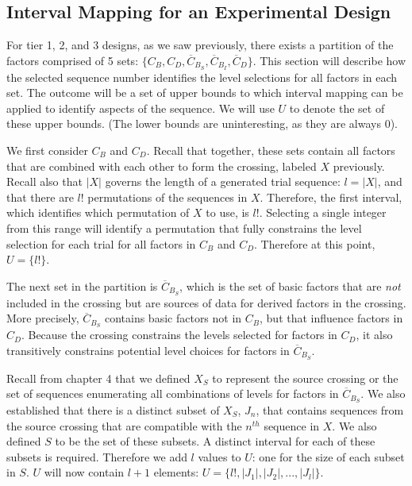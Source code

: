 \subsection{Interval Mapping for an Experimental Design}

For tier 1, 2, and 3 designs, as we saw previously, there exists a partition of the factors comprised of 5 sets: $\{C_B, C_D, \overline{C}_{B_S}, \overline{C}_{B_I}, \overline{C}_D\}$. This section will describe how the selected sequence number identifies the level selections for all factors in each set. The outcome will be a set of upper bounds to which interval mapping can be applied to identify aspects of the sequence. We will use $U$ to denote the set of these upper bounds. (The lower bounds are uninteresting, as they are always $0$).

We first consider $C_B$ and $C_D$. Recall that together, these sets contain all factors that are combined with each other to form the crossing, labeled $X$ previously. Recall also that $|X|$ governs the length of a generated trial sequence: $l = |X|$, and that there are $l!$ permutations of the sequences in $X$. Therefore, the first interval, which identifies which permutation of $X$ to use, is $l!$. Selecting a single integer from this range will identify a permutation that fully constrains the level selection for each trial for all factors in $C_B$ and $C_D$. Therefore at this point, $U = \{l!\}$.

The next set in the partition is $\overline{C}_{B_S}$, which is the set of basic factors that are \textit{not} included in the crossing but are sources of data for derived factors in the crossing. More precisely, $\overline{C}_{B_S}$ contains basic factors not in $C_B$, but that influence factors in $C_D$. Because the crossing constrains the levels selected for factors in $C_D$, it also transitively constrains potential level choices for factors in $\overline{C}_{B_S}$.

Recall from chapter 4 that we defined $X_S$ to represent the source crossing or the set of sequences enumerating all combinations of levels for factors in $\overline{C}_{B_S}$. We also established that there is a distinct subset of $X_S$, $J_n$, that contains sequences from the source crossing that are compatible with the $n^{th}$ sequence in $X$. We also defined $S$ to be the set of these subsets. A distinct interval for each of these subsets is required. Therefore we add $l$ values to $U$: one for the size of each subset in $S$. $U$ will now contain $l + 1$ elements: $U = \{l!, |J_1|, |J_2|, ..., |J_l|\}$.


